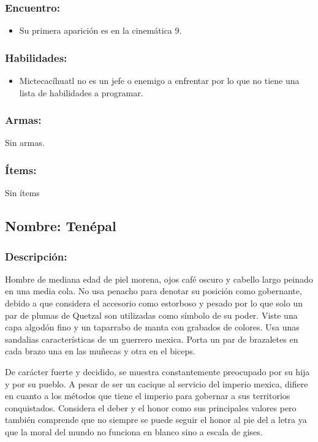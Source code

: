 \documentclass[11pt,letterpaper]{article}
\begin{document}
\subsubsection{Encuentro:}
\begin{itemize}
	\item Su primera aparición es en la cinemática 9.
\end{itemize} 

\subsubsection{Habilidades:}
\begin{itemize}
	\item Mictecacíhuatl no es un jefe o enemigo a enfrentar por lo que no tiene una lista de habilidades a programar.
\end{itemize}  
\subsubsection{Armas:}
Sin armas.
\subsubsection{Ítems:}
Sin ítems


\subsection{Nombre: Tenépal}  
\subsubsection{Descripción:}   
Hombre de mediana edad de piel morena, ojos café oscuro y cabello largo peinado en una media cola. No usa penacho para denotar su posición como gobernante, debido a que considera el accesorio como estorboso y pesado por lo que solo un par de plumas de Quetzal son utilizadas como símbolo de su poder. Viste una capa algodón fino y un taparrabo de manta con grabados de colores. Usa unas sandalias características de un guerrero mexica. Porta un par de brazaletes en cada brazo una en las muñecas y otra en el biceps.
\\
\par
De carácter fuerte y decidido, se muestra constantemente preocupado por su hija y por su pueblo. A pesar de ser un cacique al servicio del imperio mexica, difiere en cuanto a los métodos que tiene el imperio para gobernar a sus territorios conquistados. Considera el deber y el honor como sus principales valores pero también comprende que no siempre se puede seguir el honor al pie del a letra ya que la moral del mundo no funciona en blanco sino a escala de gises. 
\end{document}
